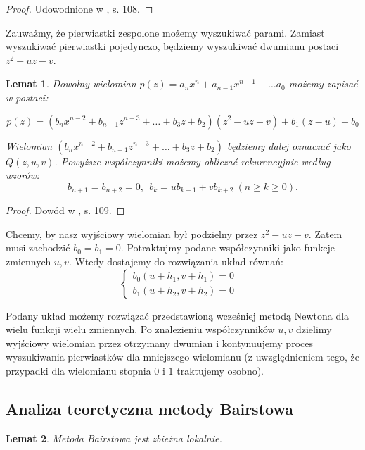 \documentclass{article}
\newtheorem{lemat}{Lemat}
\begin{document}
\begin{proof}
Udowodnione w \cite{kincaid}, s. 108.	
\end{proof}

Zauważmy, że pierwiastki zespolone możemy wyszukiwać parami. Zamiast wyszukiwać pierwiastki pojedynczo, będziemy wyszukiwać dwumianu postaci $z^2 - uz - v$.

\begin{lemat}
Dowolny wielomian $p(z) = a_nx^n  + a_{n-1}x^{n-1} + \ldots a_0$ możemy zapisać w postaci: 

$$p(z) = \left(b_nx^{n-2} + b_{n-1}z^{n-3} + \ldots + b_3 z + b_2 \right) \left( z^2 - uz - v \right) + b_1(z-u) + b_0 $$	

Wielomian $ \left(b_nx^{n-2} + b_{n-1}z^{n-3} + \ldots + b_3 z + b_2 \right) $ będziemy dalej oznaczać jako $Q(z, u, v)$.
Powyższe współczynniki możemy obliczać rekurencyjnie według wzorów:
$$b_{n+1} = b_{n+2} = 0, \ \ b_k = ub_{k+1} + vb_{k+2} \ (n \geq k \geq 0).$$

\end{lemat}

\begin{proof}
Dowód w \cite{kincaid}, s. 109.	
\end{proof}

Chcemy, by nasz wyjściowy wielomian był podzielny przez $z^2 - uz - v$. Zatem musi zachodzić $b_0 = b_1 = 0$. Potraktujmy podane współczynniki jako funkcje zmiennych $u,v$. Wtedy dostajemy do rozwiązania układ równań:
$$
\left\{\begin{matrix}
b_0(u + h_1, v + h_1) = 0 & \\ 
b_1(u + h_2, v + h_2) = 0 & 
\end{matrix}\right.
$$

Podany układ możemy rozwiązać przedstawioną wcześniej metodą Newtona dla wielu funkcji wielu zmiennych. Po znalezieniu współczynników $u, v$ dzielimy wyjściowy wielomian przez otrzymany dwumian i kontynuujemy proces wyszukiwania pierwiastków dla mniejszego wielomianu (z uwzględnieniem tego, że przypadki dla wielomianu stopnia $0$ i $1$ traktujemy osobno).

\subsection{Analiza teoretyczna metody Bairstowa}

\begin{lemat}
Metoda Bairstowa jest zbieżna lokalnie.	
\end{lemat}
\end{document}
